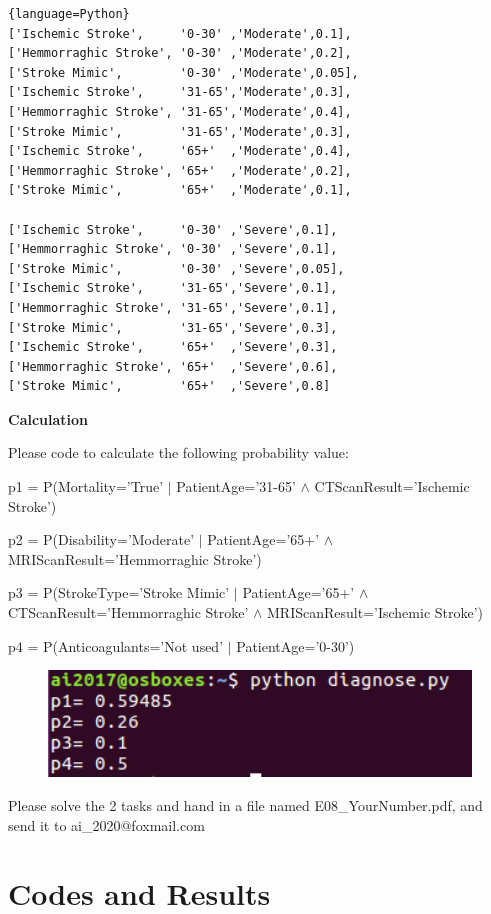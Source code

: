 \documentclass[a4paper, 11pt]{article}
\begin{document}
\begin{lstlisting}{language=Python}
['Ischemic Stroke',     '0-30' ,'Moderate',0.1],
['Hemmorraghic Stroke', '0-30' ,'Moderate',0.2],
['Stroke Mimic',        '0-30' ,'Moderate',0.05],
['Ischemic Stroke',     '31-65','Moderate',0.3],
['Hemmorraghic Stroke', '31-65','Moderate',0.4],
['Stroke Mimic',        '31-65','Moderate',0.3],
['Ischemic Stroke',     '65+'  ,'Moderate',0.4],
['Hemmorraghic Stroke', '65+'  ,'Moderate',0.2],
['Stroke Mimic',        '65+'  ,'Moderate',0.1],

['Ischemic Stroke',     '0-30' ,'Severe',0.1],
['Hemmorraghic Stroke', '0-30' ,'Severe',0.1],
['Stroke Mimic',        '0-30' ,'Severe',0.05],
['Ischemic Stroke',     '31-65','Severe',0.1],
['Hemmorraghic Stroke', '31-65','Severe',0.1],
['Stroke Mimic',        '31-65','Severe',0.3],
['Ischemic Stroke',     '65+'  ,'Severe',0.3],
['Hemmorraghic Stroke', '65+'  ,'Severe',0.6],
['Stroke Mimic',        '65+'  ,'Severe',0.8]
\end{lstlisting}
\textbf{Calculation}

Please code to calculate the following probability value:

p1 = P(Mortality='True' $|$ PatientAge='31-65' $\land$ CTScanResult='Ischemic Stroke')

p2 = P(Disability='Moderate' $|$ PatientAge='65+' $\land$  MRIScanResult='Hemmorraghic Stroke')

p3 = P(StrokeType='Stroke Mimic' $|$ PatientAge='65+' $\land$ CTScanResult='Hemmorraghic Stroke' $\land$ MRIScanResult='Ischemic Stroke')

p4 = P(Anticoagulants='Not used' $|$ PatientAge='0-30')

\begin{figure}[ht]
\centering
\includegraphics[width=12cm]{Pic/diagnose_result}
\end{figure}

Please solve the 2 tasks and hand in a file named \textsf{E08\_YourNumber.pdf}, and send it to \textsf{ai\_2020@foxmail.com}


\section{Codes and Results}
\end{document}
